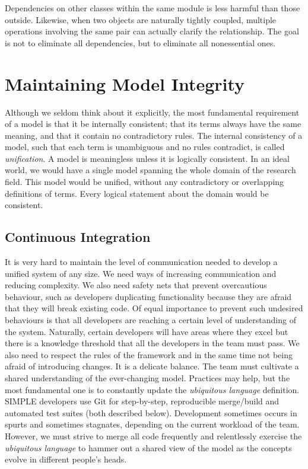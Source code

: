 \documentclass[a4paper,11pt]{article}
\begin{document}
Dependencies on other classes within the same module is less harmful than those outside. Likewise, when two objects are naturally tightly coupled, multiple operations involving the same pair can actually clarify the relationship. The goal is not to eliminate all dependencies, but to eliminate all nonessential ones.

\section{Maintaining Model Integrity}
Although we seldom think about it explicitly, the most fundamental requirement of a model is that it be internally consistent; that its terms always have the same meaning, and that it contain no contradictory rules. The internal consistency of a model, such that each term is unambiguous and no rules contradict, is called \textit{unification}. A model is meaningless unless it is logically consistent. In an ideal world, we would have a single model spanning the whole domain of the research field. This model would be unified, without any contradictory or overlapping definitions of terms. Every logical statement about the domain would be consistent. 

\subsection{Continuous Integration}
It is very hard to maintain the level of communication needed to develop a unified system of any size. We need ways of increasing communication and reducing complexity. We also need safety nets that prevent overcautious behaviour, such as developers duplicating functionality because they are afraid that they will break existing code. Of equal importance to prevent such undesired behaviours is that all developers are reaching a certain level of understanding of the system. Naturally, certain developers will have areas where they excel but there is a knowledge threshold that all the developers in the team must pass. We also need to respect the rules of the framework and in the same time not being afraid of introducing changes. It is a delicate balance. The team must cultivate a shared understanding of the ever-changing model. Practices may help, but the most fundamental one is to constantly update the \textit{ubiquitous language} definition. SIMPLE developers use Git for step-by-step, reproducible merge/build and automated test suites (both described below). Development sometimes occurs in spurts and sometimes stagnates, depending on the current workload of the team. However, we must strive to merge all code frequently and relentlessly exercise the  \textit{ubiquitous language} to hammer out a shared view of the model as the concepts evolve in different people's heads.
\end{document}
